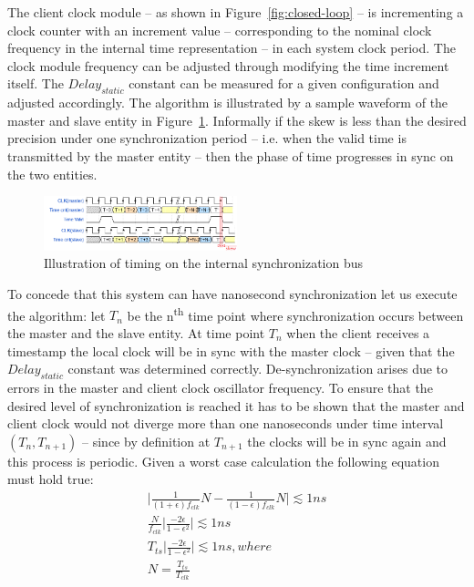 \documentclass[journal]{IEEEtran}
\begin{document}
The client clock module -- as shown in Figure~\ref{fig:closed-loop} --
is incrementing a clock counter with an increment value -- corresponding to the nominal clock frequency in the internal time representation -- in each system clock period. The clock module frequency can be adjusted through modifying the time increment itself.
The $Delay_{static}$ constant can be measured for a given configuration and adjusted accordingly. The algorithm is illustrated by a sample waveform of the master and slave entity  in Figure~\ref{fig:internalbus}. Informally if the skew is less than the desired precision under one synchronization period -- i.e. when the valid time is transmitted by the master entity -- then the phase of time progresses in sync on the two entities.

\begin{figure}[!htb]
    \centering
    \includegraphics[width=0.5\textwidth]{figures_raw/internalbustiming.png}
    \caption{Illustration of timing on the internal synchronization bus}
    \label{fig:internalbus}
\end{figure}

To concede that this system can have nanosecond synchronization let us execute the algorithm: let $T_n$ be the n\textsuperscript{th} time point where synchronization occurs between the master and the slave entity. At time point $T_n$ when the client receives a timestamp the local clock will be in sync with
the master clock -- given that the $Delay_{static}$ constant was determined correctly. De-synchronization arises due to errors in the master and client clock oscillator frequency. 
To ensure that the desired level of synchronization is reached it has to be shown that the master and client clock would not diverge more than one nanoseconds 
under time interval $(T_n,T_{n+1})$  -- since by definition at $T_{n+1}$ the clocks will be in sync again and this process is periodic. Given a worst case calculation the
following equation must hold true:
\begin{equation}\label{eq:synch}
\begin{aligned} 
\bigg\lvert \frac{1}{(1+\epsilon)f_{clk}}N - \frac{1}{(1-\epsilon)f_{clk}}N  \bigg\rvert  \lesssim 1 ns \\
\frac{N}{f_{clk}} \bigg\lvert \frac{-2\epsilon}{1 - \epsilon ^2} \bigg\rvert \lesssim 1 ns \\
T_{ts} \bigg\lvert \frac{-2\epsilon}{1 - \epsilon ^2} \bigg\rvert \lesssim 1 ns , where \\
N = \frac{T_{ts}}{T_{clk}}
\end{aligned}
\end{equation}
\end{document}
